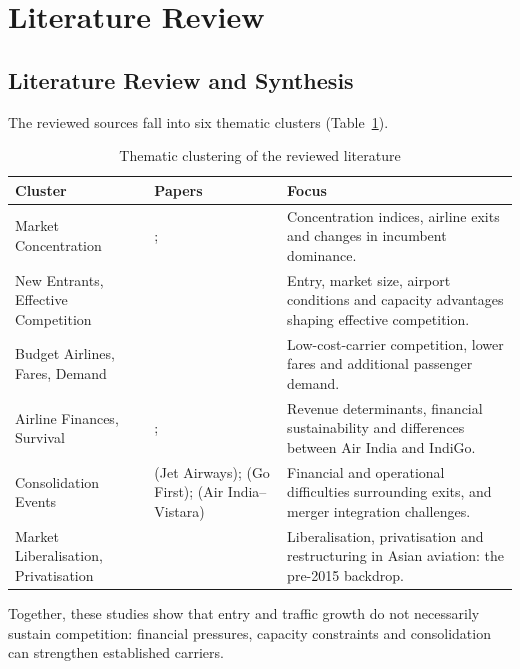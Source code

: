 \documentclass[12pt,a4paper]{article}
\newenvironment{mycontribution}{\par\color{blue}\captionsetup{font+={color=blue}}}{\par}
\begin{document}
\section{Literature Review}
\begin{mycontribution}
\subsection{Literature Review and Synthesis}
The reviewed sources fall into six thematic clusters (Table~\ref{tab:lit-clusters}).

\begin{table}[H]
\centering
\color{blue}
\caption{Thematic clustering of the reviewed literature}\label{tab:lit-clusters}
\small
\begin{tabularx}{\textwidth}{|>{\raggedright\arraybackslash}p{}|>{\raggedright\arraybackslash}X|>{\raggedright\arraybackslash}X|}
\hline
\textbf{Cluster} & \textbf{Papers} & \textbf{Focus} \\
\hline
Market Concentration & \textcite{kumari2026soaring}; \textcite{grosche2020concentration} & Concentration indices, airline exits and changes in incumbent dominance. \\
\hline
New Entrants, Effective Competition & \textcite{oliveira2018effective} & Entry, market size, airport conditions and capacity advantages shaping effective competition. \\
\hline
Budget Airlines, Fares, Demand & \textcite{wang2018determinants} & Low-cost-carrier competition, lower fares and additional passenger demand. \\
\hline
Airline Finances, Survival & \textcite{jayathilakan2024determinants}; \textcite{ali2019impact} & Revenue determinants, financial sustainability and differences between Air India and IndiGo. \\
\hline
Consolidation Events & \textcite{soman2024jet} (Jet Airways); \textcite{jasrotia2025gofirst} (Go First); \textcite{chaudhary2023airindia} (Air India--Vistara) & Financial and operational difficulties surrounding exits, and merger integration challenges. \\
\hline
Market Liberalisation, Privatisation & \textcite{findlay2004liberalization} & Liberalisation, privatisation and restructuring in Asian aviation: the pre-2015 backdrop. \\
\hline
\end{tabularx}
\end{table}

Together, these studies show that entry and traffic growth do not necessarily sustain competition: financial pressures, capacity constraints and consolidation can strengthen established carriers.


\end{mycontribution}
\end{document}

